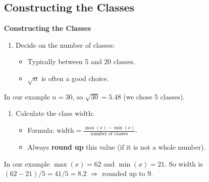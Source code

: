 \documentclass[compress]{beamer}        %
\makeatletter
\newcommand{\tcb}{\textcolor{beamer@blendedblue}}
\makeatother
\begin{document}
\subsection{Constructing the Classes}
\begin{frame}{\bf \tcb{Constructing the Classes}\\[-0.9cm]}
\begin{enumerate}[1.]\itemsep0.6cm
\item Decide on the number of classes:
\begin{itemize}\itemsep0.4cm
\item Typically between 5 and 20 classes.
\item $\sqrt{n}$ is often a good choice.
\end{itemize}
\end{enumerate}
In our example $n=30$, so $\sqrt{30} = 5.48$ (we chose 5 classes).\\[0.7cm]
\begin{enumerate}[2.]\itemsep0.6cm
\item Calculate the class width:
\begin{itemize}\itemsep0.3cm
\item Formula: $\boxed{\text{width} = \frac{\max(x) - \min(x)}{\text{number of classes}}}$.
\item Always {\bf round up} this value (if it is not a whole number).
\end{itemize}
\end{enumerate}
In our example $\max(x) = 62$ and $\min(x) = 21$. So width is $(62-21) / 5 = 41/5 = 8.2$ $\Rightarrow$ rounded up to $9$.
\end{frame}
\end{document}
